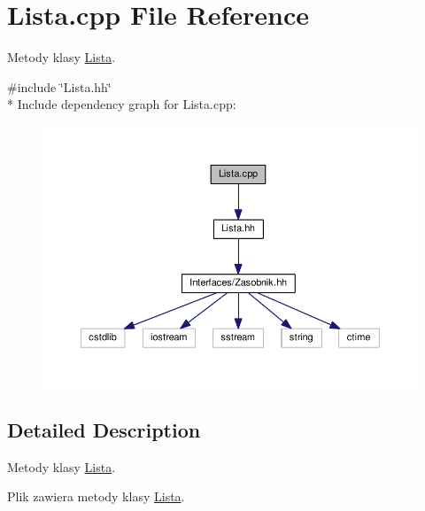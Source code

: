 \hypertarget{a00041}{}\section{Lista.\+cpp File Reference}
\label{a00041}


Metody klasy \hyperlink{a00012}{Lista}.  


{\ttfamily \#include \char`\"{}Lista.\+hh\char`\"{}}\\*
Include dependency graph for Lista.\+cpp\+:
\nopagebreak
\begin{figure}[H]
\begin{center}
\leavevmode
\includegraphics[width=350pt]{a00087}
\end{center}
\end{figure}


\subsection{Detailed Description}
Metody klasy \hyperlink{a00012}{Lista}. 

Plik zawiera metody klasy \hyperlink{a00012}{Lista}. 